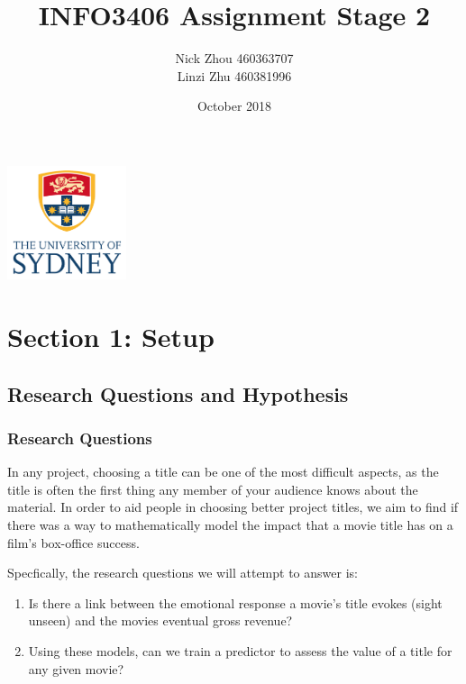 \documentclass[font=10pt]{article}
\begin{document}
  \begin{titlepage}
    \centering
    \title{\textbf{INFO3406 Assignment Stage 2}}
    \author{
      Nick Zhou 460363707\\
      Linzi Zhu 460381996
    }
    \date{October 2018}
    \maketitle
    \includegraphics[width=3.5cm]{usyd}
  \end{titlepage}

  \begin{tableofcontents}
    \tableofcontents
    \pagebreak
  \end{tableofcontents}

  \section{Section 1: Setup}
    \subsection{Research Questions and Hypothesis}
      \subsubsection{Research Questions}

	In any project, choosing a title can be one of the most difficult aspects, as the title is often the first thing any member of your audience knows about the material. In order to aid people in choosing better project titles, we aim to find if there was a way to mathematically model the impact that a movie title has on a film's box-office success.

      Specfically, the research questions we will attempt to answer is:
      \begin{enumerate}
        \item Is there a link between the emotional response a movie’s title evokes (sight unseen) and the movies eventual gross revenue?
        \item Using these models, can we train a predictor to assess the value of a title for any given movie?
      \end{enumerate}
\end{document}
